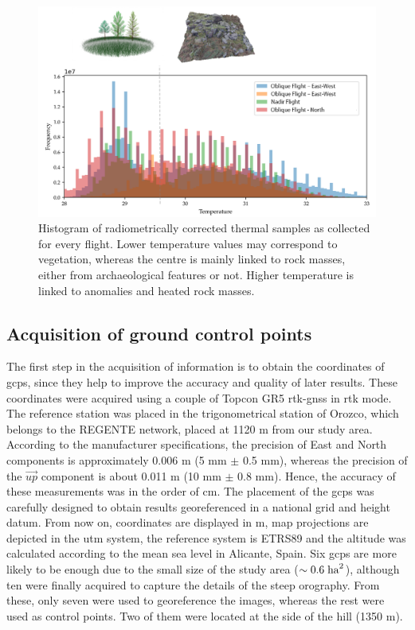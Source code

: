 \begin{figure}[ht]
    \centering
    \includegraphics[width=.9\linewidth]{figs/castle_puerta_arenas/thermal_histogram.png}
	\caption{Histogram of radiometrically corrected thermal samples as collected for every flight. Lower temperature values may correspond to vegetation, whereas the centre is mainly linked to rock masses, either from archaeological features or not. Higher temperature is linked to anomalies and heated rock masses. }
	\label{fig:temp_histogram}
\end{figure}

\subsection{Acquisition of ground control points}

The first step in the acquisition of information is to obtain the coordinates of \acrshort{gcp}s, since they help to improve the accuracy and quality of later results. These coordinates were acquired using a couple of Topcon GR5 \acrshort{rtk}-\acrshort{gnss} in \acrshort{rtk} mode. The reference station was placed in the trigonometrical station of Orozco, which belongs to the REGENTE network, placed at 1120 \si{\meter} from our study area. According to the manufacturer specifications, the precision of East and North components is approximately 0.006 \si{\meter} (5 \si{\milli\meter} $\pm$ 0.5 \si{\milli\meter}), whereas the precision of the $\Vec{\textit{up}}$ component is about 0.011 \si{\meter} (10 \si{\milli\meter} $\pm$ 0.8 \si{\milli\meter}). Hence, the accuracy of these measurements was in the order of \si{\centi\meter}. The placement of the \acrshort{gcp}s was carefully designed to obtain results georeferenced in a national grid and height datum. From now on, coordinates are displayed in \si{\meter}, map projections are depicted in the \acrshort{utm} system, the reference system is ETRS89 and the altitude was calculated according to the mean sea level in Alicante, Spain. Six \acrshort{gcp}s are more likely to be enough due to the small size of the study area ($\sim0.6 \hspace{1mm} \si{\hectare}^2$), although ten were finally acquired to capture the details of the steep orography. From these, only seven were used to georeference the images, whereas the rest were used as control points. Two of them were located at the side of the hill (1350 \si{\meter}).

